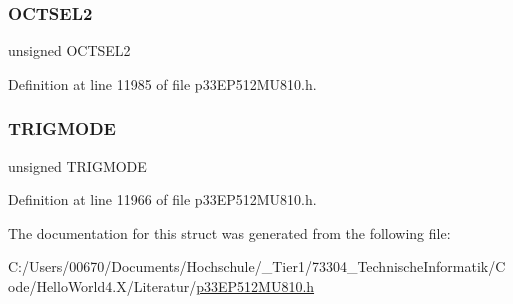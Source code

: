 \subsubsection{\texorpdfstring{O\+C\+T\+S\+E\+L2}{OCTSEL2}}
{\footnotesize\ttfamily unsigned O\+C\+T\+S\+E\+L2}



Definition at line 11985 of file p33\+E\+P512\+M\+U810.\+h.

\mbox{\label{structtag_o_c13_c_o_n1_b_i_t_s_a7a0057e0dca6e2663584b5b9e1da04c3}} 
\subsubsection{\texorpdfstring{T\+R\+I\+G\+M\+O\+DE}{TRIGMODE}}
{\footnotesize\ttfamily unsigned T\+R\+I\+G\+M\+O\+DE}



Definition at line 11966 of file p33\+E\+P512\+M\+U810.\+h.



The documentation for this struct was generated from the following file\+:\begin{DoxyCompactItemize}
\item 
C\+:/\+Users/00670/\+Documents/\+Hochschule/\+\_\+\+Tier1/73304\+\_\+\+Technische\+Informatik/\+Code/\+Hello\+World4.\+X/\+Literatur/\hyperlink{p33_e_p512_m_u810_8h}{p33\+E\+P512\+M\+U810.\+h}\end{DoxyCompactItemize}
